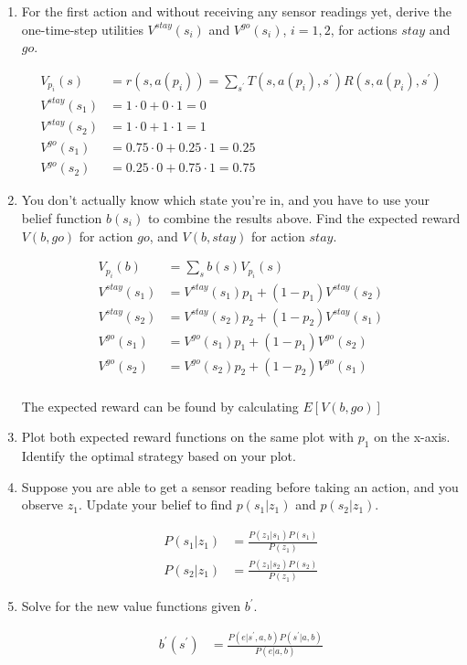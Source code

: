\documentclass[12pt]{article}
\begin{document}
\begin{enumerate}

\item For the first action and without receiving any sensor readings
  yet, derive the one-time-step utilities $V^{stay}(s_i)$ and
  $V^{go}(s_i)$, $i=1,2$, for actions $stay$ and $go$.

\begin{align*}
  V_{p_{i}}(s) &= r(s,a(p_{i})) = \sum_{s^{\prime}}T(s,a(p_{i}),s^{\prime})R(s,a(p_{i}),s^{\prime})\\
  V^{stay}(s_{1}) &= 1\cdot 0 + 0\cdot 1 = 0\\
  V^{stay}(s_{2}) &= 1\cdot 0 + 1 \cdot 1 = 1\\
  V^{go}(s_{1}) &= 0.75 \cdot 0 + 0.25 \cdot 1 = 0.25\\
  V^{go}(s_{2}) &= 0.25\cdot 0 + 0.75 \cdot 1 = 0.75
\end{align*}

\item You don't actually know which state you're in, and you have to
  use your belief function $b(s_i)$ to combine the results above.
  Find the expected reward $V(b,go)$ for action $go$, and $V(b,stay)$
  for action $stay$.

\begin{align*}
  V_{p_{i}}(b) &= \sum_{s}b(s)V_{p_{i}}(s)\\
  V^{stay}(s_{1}) &= V^{stay}(s_{1})p_{1} + (1 - p_{1})V^{stay}(s_{2})\\
  V^{stay}(s_{2}) &= V^{stay}(s_{2})p_{2} + (1 - p_{2})V^{stay}(s_{1})\\
  V^{go}(s_{1}) &= V^{go}(s_{1})p_{1} + (1 - p_{1})V^{go}(s_{2})\\
  V^{go}(s_{2}) &= V^{go}(s_{2})p_{2} + (1 - p_{2})V^{go}(s_{1})\\
\end{align*}

The expected reward can be found by calculating $E[V(b,go)]$


\item Plot both expected reward functions on the same plot with $p_1$
  on the x-axis.  Identify the optimal strategy based on your plot.

\item Suppose you are able to get a sensor reading before taking an
  action, and you observe $z_1$.  Update your belief to find $p(s_1 |
  z_1)$ and $p(s_2 | z_1)$.

  \begin{align*}
    P(s_{1}|z_{1}) &= \frac{P(z_{1}|s_{1})P(s_{1})}{P(z_{1})}\\
    P(s_{2}|z_{1}) &= \frac{P(z_{1}|s_{2})P(s_{2})}{P(z_{1})}
    \end{align*}

\item Solve for the new value functions given $b^{\prime}$.

\begin{align*}
  b^{\prime}(s^{\prime}) &= \frac{P(e|s^{\prime},a,b)P(s^{\prime}|a,b)}{P(e|a,b)}
\end{align*}

\end{enumerate}
 
\end{document}
